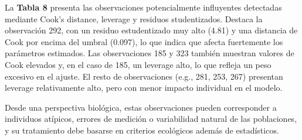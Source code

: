 \documentclass[
  spanish,
  11pt,
  a4paper,
  DIV=11,
  numbers=noendperiod]{scrartcl}
\newenvironment{Shaded}{\begin{snugshade}}{\end{snugshade}}
\newcommand{\AttributeTok}[1]{\textcolor[rgb]{0.40,0.45,0.13}{#1}}
\newcommand{\CommentTok}[1]{\textcolor[rgb]{0.37,0.37,0.37}{#1}}
\newcommand{\ControlFlowTok}[1]{\textcolor[rgb]{0.00,0.23,0.31}{\textbf{#1}}}
\newcommand{\DecValTok}[1]{\textcolor[rgb]{0.68,0.00,0.00}{#1}}
\newcommand{\FunctionTok}[1]{\textcolor[rgb]{0.28,0.35,0.67}{#1}}
\newcommand{\NormalTok}[1]{\textcolor[rgb]{0.00,0.23,0.31}{#1}}
\newcommand{\OtherTok}[1]{\textcolor[rgb]{0.00,0.23,0.31}{#1}}
\newcommand{\SpecialCharTok}[1]{\textcolor[rgb]{0.37,0.37,0.37}{#1}}
\newcommand{\StringTok}[1]{\textcolor[rgb]{0.13,0.47,0.30}{#1}}
\begin{document}
La \textbf{Tabla 8} presenta las observaciones potencialmente
influyentes detectadas mediante Cook's distance, leverage y residuos
studentizados. Destaca la observación 292, con un residuo estudentizado
muy alto (4.81) y una distancia de Cook por encima del umbral (0.097),
lo que indica que afecta fuertemente los parámetros estimados. Las
observaciones 185 y 323 también muestran valores de Cook elevados y, en
el caso de 185, un leverage alto, lo que refleja un peso excesivo en el
ajuste. El resto de observaciones (e.g., 281, 253, 267) presentan
leverage relativamente alto, pero con menor impacto individual en el
modelo.

Desde una perspectiva biológica, estas observaciones pueden corresponder
a individuos atípicos, errores de medición o variabilidad natural de las
poblaciones, y su tratamiento debe basarse en criterios ecológicos
además de estadísticos.

\begin{Shaded}
\end{Shaded}
\end{document}
